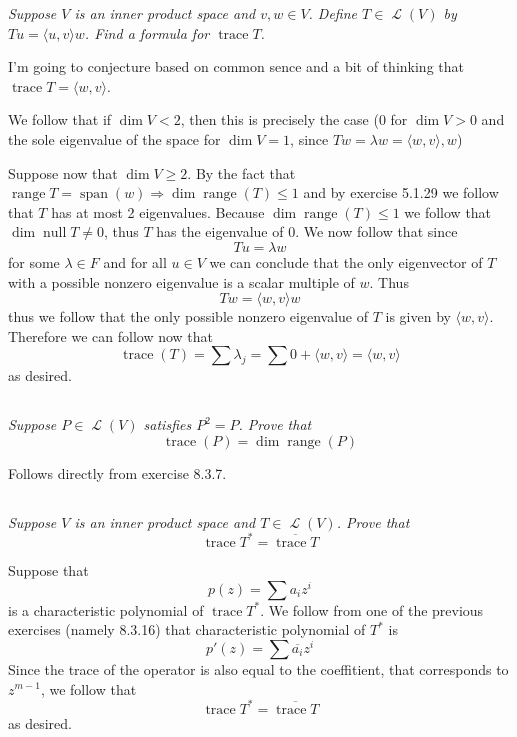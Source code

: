 \documentclass[11pt,oneside,titlepage]{book}
\DeclareMathOperator \map {\mathcal {L}}
\DeclareMathOperator \ns {null}
\DeclareMathOperator \range {range}
\DeclareMathOperator \trace {trace}
\DeclareMathOperator \Span {span}
\newcommand{\eangle}[1]{\langle #1 \rangle}
\begin{document}
\textit{Suppose $V$ is an inner product space and $v, w \in V$. Define $T \in \map(V)$
  by $Tu = \eangle{u, v}w$. Find a formula for $\trace T$.}


I'm going to conjecture based on common sence and a bit of thinking that $\trace T = \eangle{w, v}$.

We follow that if $\dim V < 2$, then this is precisely the case (0 for $\dim V > 0$ and
the sole eigenvalue of the space for $\dim V = 1$, since $T w = \lambda w = \eangle{w, v}, w$)

Suppose now that $\dim V \geq 2$. By the fact that  $\range T = \Span(w) \Rightarrow
\dim \range(T) \leq 1$
and by exercise 5.1.29 we follow that $T$ has at most 2 eigenvalues. Because
$\dim \range(T) \leq 1$ we follow that $\dim \ns T \neq 0$, thus $T$ has the eigenvalue of $0$.
We now follow that since
$$T u = \lambda w$$
for some $\lambda \in F$ and for all $u \in V$ we can conclude that the only eigenvector of $T$
with a possible nonzero eigenvalue is a scalar multiple of $w$. Thus
$$T w = \eangle{w, v} w$$
thus we follow that the only possible nonzero eigenvalue of $T$ is given by $\eangle{w, v}$.
Therefore we can follow now that
$$\trace(T) = \sum {\lambda_j} = \sum{0} + \eangle{w, v} = \eangle{w, v}$$
as desired.

\subsection{}

\textit{Suppose $P \in \map(V)$ satisfies $P^2 = P$. Prove that
  $$\trace(P) = \dim \range(P)$$
}

Follows directly from exercise 8.3.7.

\subsection{}

\textit{Suppose $V$ is an inner product space and $T \in \map(V)$. Prove that
  $$\trace T^* = \overline{\trace T}$$
}

Suppose that
$$p(z) = \sum{a_i z^i}$$
is a characteristic polynomial of $\trace T^*$. We follow from
one of the previous exercises (namely 8.3.16) that characteristic polynomial of $T^*$ is
$$p'(z) = \sum{\overline{a_i} z^i}$$
Since the trace of the operator is also equal to the coeffitient, that corresponds to
$z^{m - 1}$, we follow that
$$\trace T^* = \overline{\trace T}$$
as desired.

\subsection{}
\end{document}
